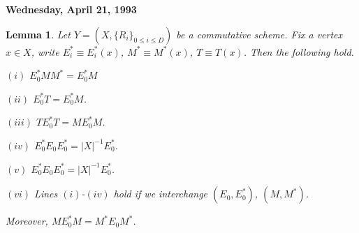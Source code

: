 \documentclass[
]{book}
\newtheorem{lemma}{Lemma}[chapter]
\theoremstyle{definition}
\theoremstyle{definition}
\theoremstyle{definition}
\theoremstyle{definition}
\theoremstyle{remark}
\begin{document}
\textbf{Wednesday, April 21, 1993}

\begin{lemma}
\protect\hypertarget{lem:mezerostarm}{}\label{lem:mezerostarm}Let \(Y = (X, \{R_i\}_{0\leq i\leq D})\) be a commutative scheme. Fix a vertex \(x\in X\), write \(E^*_i\equiv E^*_i(x)\), \(M^* \equiv M^*(x)\), \(T\equiv T(x)\). Then the following hold.

\((i)\) \(E^*_0MM^* = E^*_0M\)

\((ii)\) \(E^*_0T = E^*_0M\).

\((iii)\) \(TE^*_0T = ME^*_0M\).

\((iv)\) \(E^*_0E_0E^*_0 = |X|^{-1}E^*_0\).

\((v)\) \(E^*_0E_0E^*_0 = |X|^{-1}E^*_0\).

\((vi)\) Lines \((i)\)-\((iv)\) hold if we interchange \((E_0, E^*_0)\), \((M, M^*)\).

Moreover, \(ME^*_0M = M^*E_0M^*\).
\end{lemma}
\end{document}
